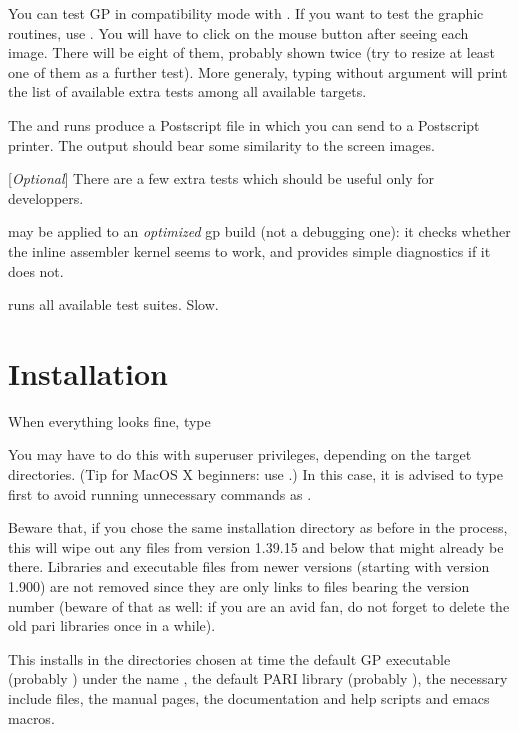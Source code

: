 You can test GP in compatibility mode with . If you
want to test the graphic routines, use . You will
have to click on the mouse button after seeing each image. There will be
eight of them, probably shown twice (try to resize at least one of them
as a further test). More generaly, typing  without argument
will print the list of available extra tests among all available targets.

The  and  runs produce a Postscript
file  in  which you can send to a Postscript
printer. The output should bear some similarity to the screen images.

 [{\sl Optional\/}]
There are a few extra tests which should be useful only for developpers.

 may be applied to an \emph{optimized} gp build (not a
debugging one): it checks whether the inline assembler kernel seems to work,
and provides simple diagnostics if it does not.

 runs all available test suites. Slow.



\section{Installation} When everything looks fine, type


\noindent You may have to do this with superuser privileges, depending on the
target directories. (Tip for MacOS X beginners: use .)
In this case, it is advised to type  first to avoid running
unnecessary commands as .

Beware that, if you chose the same installation directory as before in the
 process, this will wipe out any files from version 1.39.15
and below that might already be there. Libraries and executable files from
newer versions (starting with version 1.900) are not removed since they are
only links to files bearing the version number (beware of that as well: if
you are an avid  fan, do not forget to delete the old pari libraries
once in a while).

This installs in the directories chosen at  time the default
GP executable (probably ) under the name , the default
PARI library (probably ), the necessary include files, the
manual pages, the documentation and help scripts and emacs macros.

